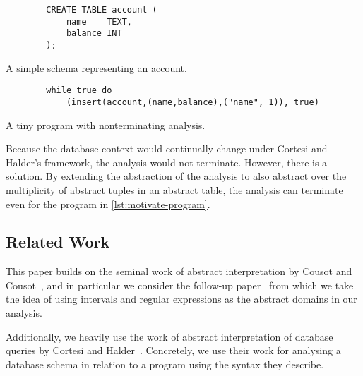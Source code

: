 \begin{listing}
    \begin{verbatim}
        CREATE TABLE account (
            name    TEXT,
            balance INT
        );
    \end{verbatim}
    \caption{A simple schema representing an account.}
    \label{lst:motivate-sql}
\end{listing}


\begin{listing}
    \begin{verbatim}
        while true do
            (insert(account,(name,balance),("name", 1)), true)
    \end{verbatim}
    \caption{A tiny program with nonterminating analysis.}
    \label{lst:motivate-program}
\end{listing}

Because the database context would continually change under Cortesi and Halder's framework, the analysis would not terminate.
However, there is a solution.
By extending the abstraction of the analysis to also abstract over the multiplicity of abstract tuples in an abstract table, the analysis can terminate even for the program in \autoref{lst:motivate-program}.



\subsection{Related Work}\label{subsec:related-work}
This paper builds on the seminal work of abstract interpretation by Cousot and Cousot~\cite{cousot_abstract_1977}, and in particular we consider the follow-up paper~\cite{cousot_abstract_1996} from which we take the idea of using intervals and regular expressions as the abstract domains in our analysis.

Additionally, we heavily use the work of abstract interpretation of database queries by Cortesi and Halder~\cite{halder_abstract_2012}.
Concretely, we use their work for analysing a database schema in relation to a program using the syntax they describe.

